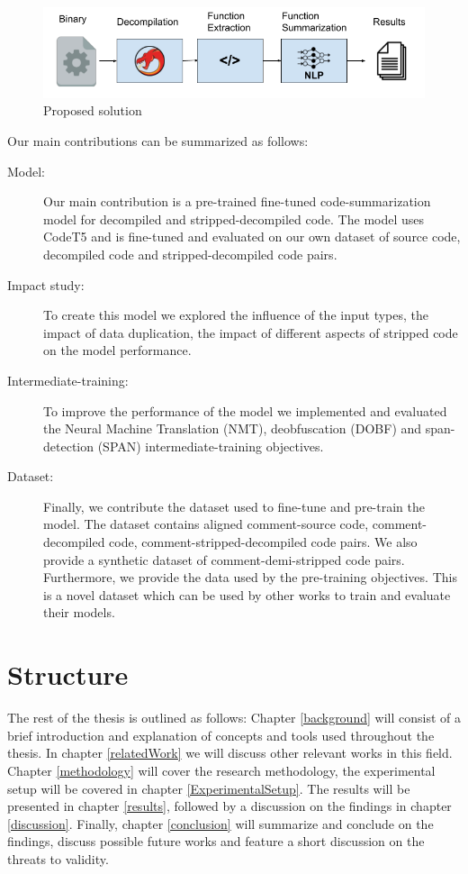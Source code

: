 \label{fig:useCase}
\begin{figure}[htb]
    \centering
    \includegraphics[width=\textwidth,height=\textheight,keepaspectratio]{img/UseCase.png}
    \caption{Proposed solution}
\end{figure}

Our main contributions can be summarized as follows:
\begin{description}
 \item[Model:] Our main contribution is a pre-trained fine-tuned code-summarization model for decompiled and stripped-decompiled code. The model uses CodeT5 and is fine-tuned and evaluated on our own dataset of source code, decompiled code and stripped-decompiled code pairs. 
 \item[Impact study:] To create this model we explored the influence of the input types, the impact of data duplication, the impact of different aspects of stripped code on the model performance.
 \item[Intermediate-training:] To improve the performance of the model we implemented and evaluated the Neural Machine Translation (NMT), deobfuscation (DOBF) and span-detection (SPAN) intermediate-training objectives. 
 \item[Dataset:] Finally, we contribute the dataset used to fine-tune and pre-train the model. The dataset contains aligned comment-source code, comment-decompiled code, comment-stripped-decompiled code pairs. We also provide a synthetic dataset of comment-demi-stripped code pairs. Furthermore, we provide the data used by the pre-training objectives. This is a novel dataset which can be used by other works to train and evaluate their models.
\end{description}

\section{Structure}
The rest of the thesis is outlined as follows: Chapter \ref{background} will consist of a brief introduction and explanation of concepts and tools used throughout the thesis. In chapter \ref{relatedWork} we will discuss other relevant works in this field.  Chapter \ref{methodology}  will cover the research methodology, the experimental setup will be covered in chapter \ref{ExperimentalSetup}. The results will be presented in chapter \ref{results}, followed by a discussion on the findings in chapter \ref{discussion}. Finally, chapter \ref{conclusion} will summarize and conclude on the findings, discuss possible future works and feature a short discussion on the threats to validity.